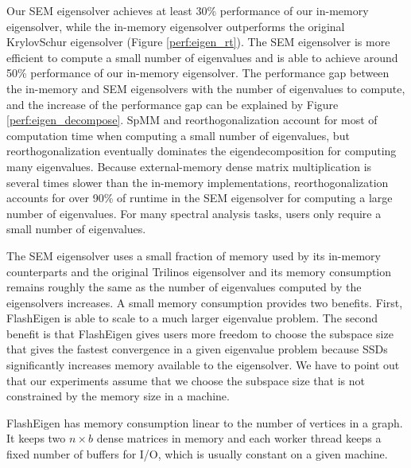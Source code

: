 Our SEM eigensolver achieves at least 30\% performance of our in-memory
eigensolver, while the in-memory eigensolver outperforms the original
KrylovSchur eigensolver (Figure \ref{perf:eigen_rt}). The SEM eigensolver
is more efficient to compute a small number of eigenvalues and is able
to achieve around 50\% performance of our in-memory eigensolver.
The performance gap between the in-memory and SEM eigensolvers with the number
of eigenvalues to compute, and the increase of the performance gap can be
explained by Figure \ref{perf:eigen_decompose}. SpMM and reorthogonalization
account for most of computation time when computing a small number of eigenvalues,
but reorthogonalization eventually dominates the eigendecomposition for computing
many eigenvalues. Because external-memory dense matrix multiplication is several
times slower than the in-memory implementations, reorthogonalization accounts for
over 90\% of runtime in the SEM eigensolver for computing a large number of
eigenvalues. For many spectral analysis tasks, users only require a small number
of eigenvalues.

%		

The SEM eigensolver uses a small fraction of memory used by its in-memory
counterparts and the original Trilinos eigensolver and its memory consumption
remains roughly the same as the number of eigenvalues computed by the eigensolvers
increases. A small memory consumption provides two benefits. First, FlashEigen
is able to scale to a much larger eigenvalue problem. The second benefit is that
FlashEigen gives users more freedom to choose the subspace size that gives the
fastest convergence in a given eigenvalue problem because SSDs significantly
increases memory available to the eigensolver. We have to point out that our
experiments assume that we choose the subspace size that is not constrained by
the memory size in a machine.

FlashEigen has memory consumption linear to the number of vertices in a graph.
It keeps two $n \times b$ dense matrices in memory and each worker thread
keeps a fixed number of buffers for I/O, which is usually constant on a given
machine.

